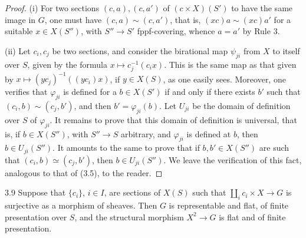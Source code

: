 \begin{proof}
(i) For two sections
\((c,a),(c,a')\) of \((c\times X)(S')\)
to have the same image in \(G\),
one must have \((c,a)\sim(c,a')\),
that is, \((xc)a\sim(xc)a'\)
for a suitable \(x\in X(S'')\),
with \(S''\to S'\) fppf-covering,
whence \(a=a'\) by Rule 3.

(ii) Let \(c_i,c_j\) be two
sections, and consider the
birational map \(\psi_{ji}\)
from \(X\) to itself over \(S\),
given by the formula
\(x\mapsto c_j^{-1}(c_i x)\).
This is the same map as that
given by \(x\mapsto(yc_j)^{-1}((yc_i)x)\),
if \(y\in X(S)\), as one
easily sees.
Moreover, one verifies that
\(\varphi_{ji}\) is defined
for a \(b\in X(S')\) if
and only if there exists
\(b'\) such that
\((c_i,b)\sim(c_j,b')\),
and then \(b'=\varphi_{ji}(b)\).
Let \(U_{ji}\) be the
domain of definition over
\(S\) of \(\varphi_{ji}\).
It remains to prove that
this domain of definition
is universal, that is,
if \(b\in X(S'')\),
with \(S''\to S\) arbitrary,
and \(\varphi_{ji}\) is
defined at \(b\), then
\(b\in U_{ji}(S'')\).
It amounts to the same
to prove that if \(b,b'\in X(S'')\)
are such that
\((c_i,b)\simeq(c_j,b')\),
then \(b\in U_{ji}(S'')\).
We leave the verification
of this fact, analogous
to that of (3.5), to the reader.
\end{proof}
\begin{lemma}{3.9}\label{XVIII.3.9}
Suppose that \(\{c_i\}\),
\(i\in I\), are sections
of \(X(S)\) such that
\(\coprod_i c_i\times X\to G\)
is surjective as a morphism
of sheaves.
Then \(G\) is representable
and flat, of finite presentation
over \(S\), and the structural
morphism \(X^2\to G\)
is flat and of finite presentation.
\end{lemma}
